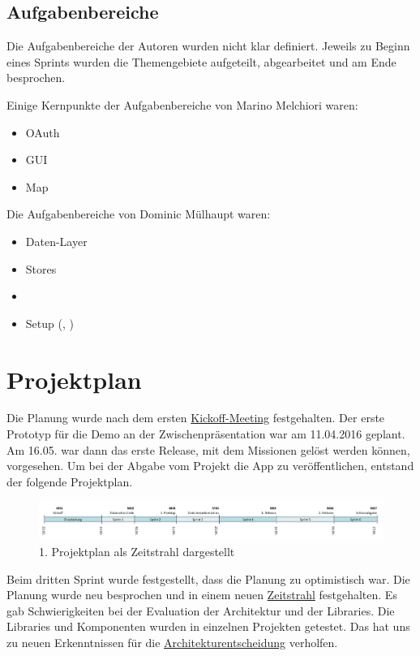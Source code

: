 \subsection*{Aufgabenbereiche}
Die Aufgabenbereiche der Autoren wurden nicht klar definiert. 
Jeweils zu Beginn eines Sprints wurden die Themengebiete aufgeteilt, abgearbeitet und am Ende besprochen. 

Einige Kernpunkte der Aufgabenbereiche von Marino Melchiori waren:
\begin{itemize}
	\item \gls{OAuth}
	\item \gls{GUI}
	\item Map
\end{itemize}

Die Aufgabenbereiche von Dominic Mülhaupt waren:
\begin{itemize}
	\item Daten-Layer
	\item Stores
	\item {}
	\item Setup (, )
\end{itemize}




\section{Projektplan}
\label{pm-projektplan}

Die Planung wurde nach dem ersten \hyperref[pm-ms1]{Kickoff-Meeting} festgehalten. 
Der erste Prototyp für die Demo an der Zwischenpräsentation war am 11.04.2016 geplant. 
Am 16.05. war dann das erste Release, mit dem Missionen gelöst werden können, vorgesehen. 
Um bei der Abgabe vom Projekt die App zu veröffentlichen, entstand der folgende Projektplan.

\begin{figure}[H]
	\centering
	\includegraphics[width=\textwidth]{images/projektmanagement/zeitstrahl_v1.png}
	\caption{1. Projektplan als Zeitstrahl dargestellt}
	\label{image-project-plan-timeline1}
\end{figure}

Beim dritten Sprint wurde festgestellt, dass die Planung zu optimistisch war. 
Die Planung wurde neu besprochen und in einem neuen \hyperref[image-project-plan-timeline2]{Zeitstrahl} festgehalten. 
Es gab Schwierigkeiten bei der Evaluation der Architektur und der Libraries. 
Die Libraries und Komponenten wurden in einzelnen Projekten getestet. 
Das hat uns zu neuen Erkenntnissen für die \hyperref[tb-evaluation-architektur]{Architekturentscheidung} verholfen. 

